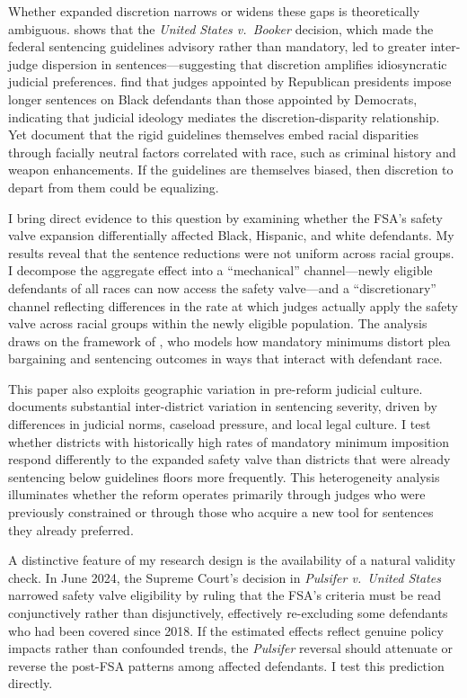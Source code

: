 \documentclass[12pt]{article}
\begin{document}
Whether expanded discretion narrows or widens these gaps is theoretically ambiguous. \citet{yang2015free} shows that the \textit{United States v.\ Booker} decision, which made the federal sentencing guidelines advisory rather than mandatory, led to greater inter-judge dispersion in sentences---suggesting that discretion amplifies idiosyncratic judicial preferences. \citet{cohen2019judicial} find that judges appointed by Republican presidents impose longer sentences on Black defendants than those appointed by Democrats, indicating that judicial ideology mediates the discretion-disparity relationship. Yet \citet{fischman2012racial} document that the rigid guidelines themselves embed racial disparities through facially neutral factors correlated with race, such as criminal history and weapon enhancements. If the guidelines are themselves biased, then discretion to depart from them could be equalizing.

I bring direct evidence to this question by examining whether the FSA's safety valve expansion differentially affected Black, Hispanic, and white defendants. My results reveal that the sentence reductions were not uniform across racial groups. I decompose the aggregate effect into a ``mechanical'' channel---newly eligible defendants of all races can now access the safety valve---and a ``discretionary'' channel reflecting differences in the rate at which judges actually apply the safety valve across racial groups within the newly eligible population. The analysis draws on the framework of \citet{stevenson2018distortion}, who models how mandatory minimums distort plea bargaining and sentencing outcomes in ways that interact with defendant race.

This paper also exploits geographic variation in pre-reform judicial culture. \citet{yang2016resource} documents substantial inter-district variation in sentencing severity, driven by differences in judicial norms, caseload pressure, and local legal culture. I test whether districts with historically high rates of mandatory minimum imposition respond differently to the expanded safety valve than districts that were already sentencing below guidelines floors more frequently. This heterogeneity analysis illuminates whether the reform operates primarily through judges who were previously constrained or through those who acquire a new tool for sentences they already preferred.

A distinctive feature of my research design is the availability of a natural validity check. In June 2024, the Supreme Court's decision in \textit{Pulsifer v.\ United States} narrowed safety valve eligibility by ruling that the FSA's criteria must be read conjunctively rather than disjunctively, effectively re-excluding some defendants who had been covered since 2018. If the estimated effects reflect genuine policy impacts rather than confounded trends, the \textit{Pulsifer} reversal should attenuate or reverse the post-FSA patterns among affected defendants. I test this prediction directly.
\end{document}
